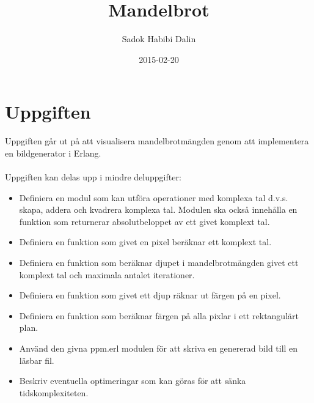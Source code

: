 \documentclass[a4paper, 11pt]{article}
\title{Mandelbrot}
\author{Sadok Habibi Dalin}
\date{2015-02-20}
\begin{document}
\maketitle
\section{Uppgiften}
Uppgiften går ut på att visualisera mandelbrotmängden genom att implementera en bildgenerator i Erlang. 
\\\\Uppgiften kan delas upp i mindre deluppgifter: 
\begin{itemize}
 \item Definiera en modul som kan utföra operationer med komplexa tal d.v.s. skapa, addera och kvadrera komplexa tal. Modulen ska också innehålla en funktion som returnerar absolutbeloppet av ett givet komplext tal. 
 \item Definiera en funktion som givet en pixel beräknar ett komplext tal. 
 \item Definiera en funktion som beräknar djupet i mandelbrotmängden givet ett komplext tal och maximala antalet iterationer. 
 \item Definiera en funktion som givet ett djup räknar ut färgen på en pixel. 
 \item Definiera en funktion som beräknar färgen på alla pixlar i ett rektangulärt plan. 
 \item Använd den givna ppm.erl modulen för att skriva en genererad bild till en läsbar fil. 
 \item Beskriv eventuella optimeringar som kan göras för att sänka tidskomplexiteten. 
\end{itemize} 
\end{document}
